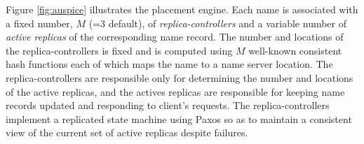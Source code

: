 Figure \ref{fig:auspice} illustrates the placement engine. Each name is associated with a fixed number, $M$ (=3 default), of  \emph{replica-controllers} and a variable number of  {\em active replicas} of the corresponding name record. The number and locations of the replica-controllers is fixed and is computed using $M$ well-known consistent hash functions each of which maps the name to a name server location. The replica-controllers are responsible only for determining the number and locations of the active  replicas, and the actives replicas are responsible for keeping name records updated and responding to client's requests. The replica-controllers implement a replicated state machine using Paxos \cite{LamportPaxos} so as to maintain a consistent view of the current set of active replicas despite failures. 




%
%
%
%





